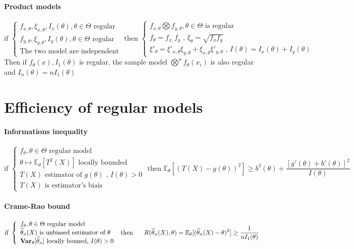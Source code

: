 \documentclass[a4paper,10pt]{article}
\begin{document}
\paragraph{Product models}
\[
\text{if }
\left\{
\begin{array}{l}
f_{x,\theta}, \xi_{x,\theta} , I_{x}(\theta) , \theta \in \Theta \text{ regular} \\
f_{y,\theta}, \xi_{y,\theta} , I_{y}(\theta) , \theta \in \Theta \text{ regular} \\
\text{The two model are independent}
\end{array}\right.
\text{ then }
\left\{
\begin{array}{l}
f_{x,\theta} \bigotimes f_{y,\theta}, \theta \in \Theta \text{ is regular}\\
f_{\theta} = f_{x,} f_{y} \text{ , } \xi_{\theta} = \sqrt{f_{x} f_{y}}\\
\xi'_{\theta} = \xi'_{x,\theta}\xi_{y,\theta} + \xi_{x,\theta}\xi'_{y,\theta} \text{ , } I(\theta)=I_x(\theta)+I_y(\theta) 
\end{array}\right.
\]
Then if {$ f_{\theta}(x) ,I_1(\theta) $} is regular, the sample model $ \bigotimes^n f_{\theta}(x_i)$ is also regular and $I_n(\theta) = n I_1(\theta)$

\section{Efficiency of regular models}
\paragraph{Informations inequality}
\[
\text{if }
\left\{
\begin{array}{l}
f_{\theta}, \theta \in \Theta \text{ regular model} \\
\theta \mapsto \mathbb{E}_{\theta}[T^2(X)] \text{ locally bounded} \\
T(X) \text{ estimator of } g(\theta) \text{ , } I(\theta) > 0 \\
T(X) \text{ is estimator's biais}
\end{array}\right.
\text{ then }
\mathbb{E}_{\theta}[(T(X)-g(\theta))^2] \geq 
b^2(\theta) + \frac{[g'(\theta)+b'(\theta)]^2}{I(\theta)}
\]

\paragraph{Crame-Rao bound}
\[
\text{if }
\left\{
\begin{array}{l}
f_{\theta}, \theta \in \Theta \text{ regular model} \\
\widehat{\theta}_n(X) \text{ is unbiased estimator of } \theta \\
\textbf{Var}_{\theta}[\widehat{\theta}_n] \text{ locally bouned, } I(\theta) > 0 \\
\end{array}\right.
\text{ then  }
\hspace{5mm}
R(\widehat{\theta}_n(X),\theta) =
\mathbb{E}_{\theta}[(\widehat{\theta}_n(X)-\theta)^2] \geq 
\frac{1}{nI_1(\theta)}
\]
\end{document}
